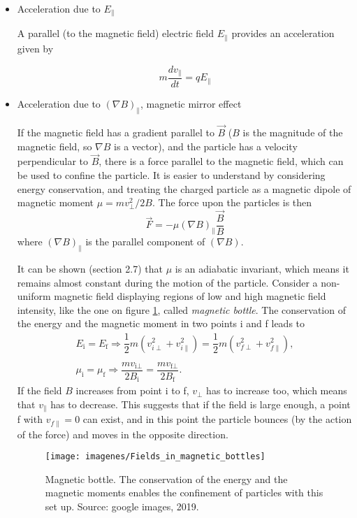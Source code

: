 \documentclass[a4paper,12pt,oneside]{book}
\begin{document}
\begin{itemize}

\item Acceleration due to $E_{\parallel}$

A parallel (to the magnetic field) electric field $E_{\parallel}$ provides an acceleration given by

\begin{equation}
m \dfrac{d v_{\parallel}}{dt}=q E_{\parallel}
\end{equation}


\item Acceleration due to $(\nabla B)_{\parallel}$, magnetic mirror effect

If the magnetic field has a gradient parallel to $\vec{B}$ ($B$ is the magnitude of the magnetic field, so $\nabla B$ is a vector), and the particle has a velocity perpendicular to $\vec{B}$, there is a force parallel to the magnetic field, which can be used to confine the particle. It is easier to understand by considering energy conservation, and treating the charged particle as a magnetic dipole of magnetic moment $\mu=m v_{\perp}^2/2 B$. The force upon the particles is then
%
\begin{equation}
\vec{F}=-\mu (\nabla B)_{\parallel} \dfrac{\vec{B}}{B}
\end{equation}
%
where $(\nabla B)_{\parallel}$ is the parallel component of $(\nabla B)$.
%

It can be shown \cite{Wesson} (section 2.7) that $\mu$ is an adiabatic invariant, which means it remains almost constant during the motion of the particle. Consider a non-uniform magnetic field displaying regions of low and high magnetic field intensity, like the one on figure \ref{fig mag bottle}, called \textit{magnetic bottle}. The conservation of the energy and the magnetic moment in two points i and f leads to
%
\begin{equation}\label{mirror conserv}
\begin{array}{c}
E_\text{i}=E_\text{f} \Rightarrow \dfrac{1}{2}m (v_{i \perp}^2+v_{i \parallel}^2)=\dfrac{1}{2}m (v_{f \perp}^2+v_{f \parallel}^2), \\
\\
\mu_\text{i}=\mu_\text{f} \Rightarrow \dfrac{mv_{\text{i} \perp}}{2B_\text{i}}=\dfrac{mv_{\text{f} \perp}}{2B_\text{f}}.
\end{array}
\end{equation}
%
If the field $B$ increases from point i to f, $v_{\perp}$ has to increase too, which means that $v_{\parallel}$ has to decrease. This suggests that if the field is large enough, a point f with $v_{f\parallel}=0$ can exist, and in this point the particle bounces (by the action of the force) and moves in the opposite direction.
%
\begin{figure}[htbp]
\centering
\texttt{[image: imagenes/Fields\_in\_magnetic\_bottles]}
\caption{Magnetic bottle. The conservation of the energy and the magnetic moments enables the confinement of particles with this set up. Source: google images, 2019.}
\label{fig mag bottle}
\end{figure}


\end{itemize}
\end{document}
